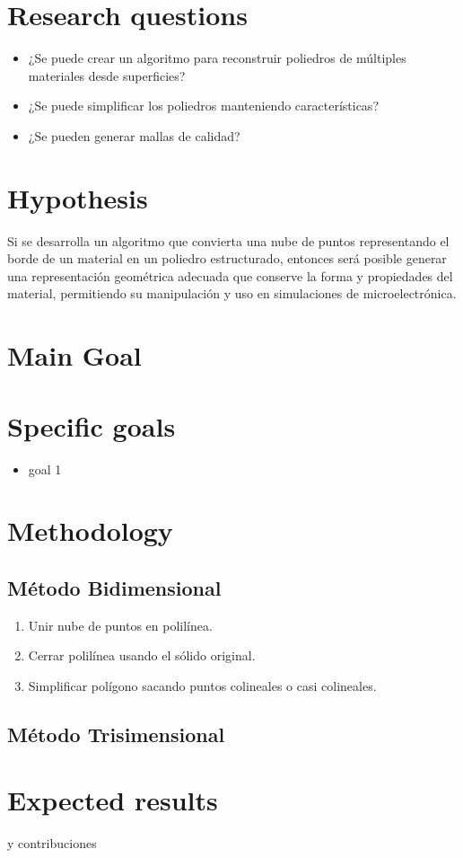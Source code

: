 \documentclass[submission]{eptcs}
\begin{document}
\section{Research questions}

\begin{itemize}
    \item ¿Se puede crear un algoritmo para reconstruir poliedros de múltiples materiales desde superficies?
    \item ¿Se puede simplificar los poliedros manteniendo características?
    \item ¿Se pueden generar mallas de calidad?
\end{itemize}


\section{Hypothesis}

Si se desarrolla un algoritmo que convierta una nube de puntos representando el borde de un material en un poliedro estructurado, entonces será posible generar una representación geométrica adecuada que conserve la forma y propiedades del material, permitiendo su manipulación y uso en simulaciones de microelectrónica.

\section{Main Goal}


\section{Specific goals}

\begin{itemize}
\item goal 1
\end{itemize}

\section{Methodology}

\subsection{Método Bidimensional}
\begin{enumerate}
    \item Unir nube de puntos en polilínea.
    \item Cerrar polilínea usando el sólido original.
    \item Simplificar polígono sacando puntos colineales o casi colineales.
\end{enumerate}
\subsection{Método Trisimensional}

\section{Expected results}

 y contribuciones

\nocite{*}


\end{document}
